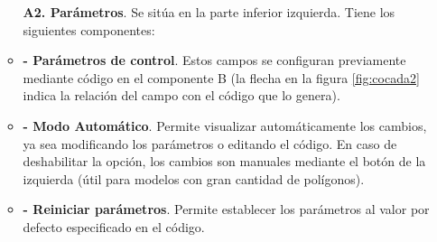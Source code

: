 \begin{itemize}
\begin{itemize}
\textbf{A2. Parámetros}. Se sitúa en la parte inferior izquierda. Tiene los siguientes componentes:\\
        \item \textbf{- Parámetros de control}.
        Estos campos se configuran previamente mediante código en el componente B (la flecha en la figura \ref{fig:cocada2} indica la relación del campo con el código que lo genera).\\
        \item \textbf{- Modo Automático}. Permite visualizar automáticamente los cambios, ya sea modificando los parámetros o editando el código. En caso de deshabilitar la opción, los cambios son manuales mediante el botón de la izquierda (útil para modelos con gran cantidad de polígonos). \\
        \item \textbf{- Reiniciar parámetros}. Permite establecer los parámetros al valor por defecto especificado en el código.
        
\end{itemize}


\end{itemize}


